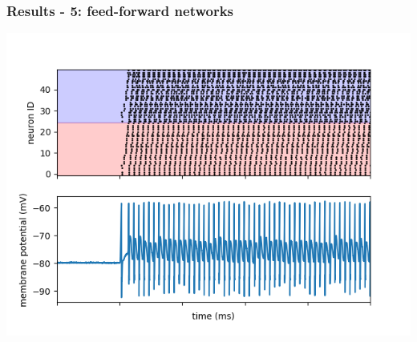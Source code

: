 \documentclass{beamer}
\begin{document}
\begin{frame}
    \frametitle{Results - 5: feed-forward networks}
    \includegraphics[width=\textwidth]{figures/feedforward signals loop.png}
\end{frame}
\end{document}
